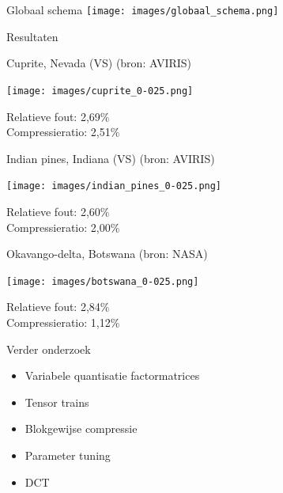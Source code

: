 \documentclass[t,12pt,dutch
\ifx\beamermode\undefined\else,\beamermode\fi
]{beamer}
\begin{document}
\begin{frame}{Globaal schema}
\vfill
\texttt{[image: images/globaal\_schema.png]}
\end{frame}

\begin{frame}{}
\begin{center}
\vspace*{\fill}
\vspace*{\fill}
\Huge
Resultaten
\normalsize
\vspace*{\fill}
\end{center}
\end{frame}

\begin{frame}{Cuprite, Nevada (VS) (bron: AVIRIS)}

\begin{center}
\texttt{[image: images/cuprite\_0-025.png]}
\end{center}

Relatieve fout: 2,69\%\\
Compressieratio: 2,51\%

\end{frame}

\begin{frame}{Indian pines, Indiana (VS) (bron: AVIRIS)}

\begin{center}
\texttt{[image: images/indian\_pines\_0-025.png]}
\end{center}

Relatieve fout: 2,60\%\\
Compressieratio: 2,00\%

\end{frame}

\begin{frame}{Okavango-delta, Botswana (bron: NASA)}

\begin{center}
\texttt{[image: images/botswana\_0-025.png]}
\end{center}

Relatieve fout: 2,84\%\\
Compressieratio: 1,12\%

\end{frame}

\begin{frame}{Verder onderzoek}

\begin{itemize}
\item Variabele quantisatie factormatrices
\item Tensor trains
\item Blokgewijse compressie
\item Parameter tuning
\item DCT
\end{itemize}

\end{frame}

\fi
\end{document}
